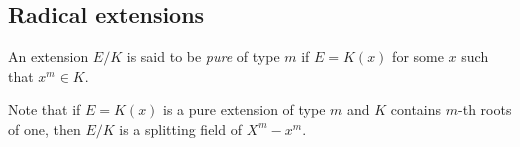 %
%
%
%
%
%
%
%    


\subsection{Radical extensions}

\begin{definition}
    An extension $E/K$ is said to be \emph{pure} of type $m$ if 
    $E=K(x)$ for some $x$ such that $x^m\in K$. 
\end{definition}

Note that if $E=K(x)$ is a pure extension of type $m$ and $K$ contains 
$m$-th roots of one, then $E/K$ is a splitting field of $X^m-x^m$. 

